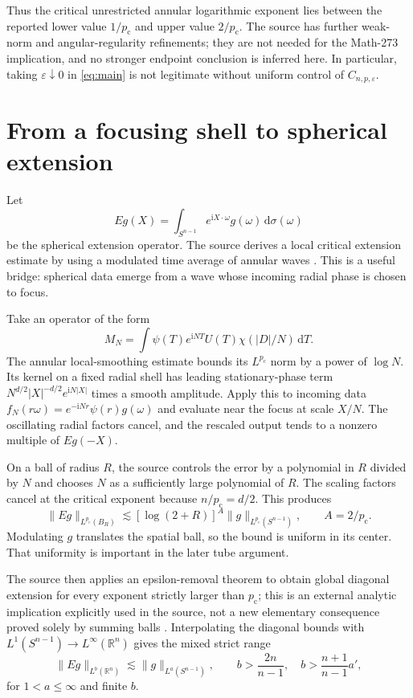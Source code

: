 \documentclass[11pt,a4paper]{article}
\numberwithin{equation}{section}
\theoremstyle{definition}
\theoremstyle{remark}
\newcommand{\R}{\mathbb R}
\newcommand{\eps}{\varepsilon}
\newcommand{\dd}{\,\mathrm d}
\newcommand{\pc}{p_{\mathrm c}}
\begin{document}
Thus the critical unrestricted annular logarithmic exponent lies between the
reported lower value $1/\pc$ and upper value $2/\pc$. The source has further
weak-norm and angular-regularity refinements; they are not needed for the
Math-273 implication, and no stronger endpoint conclusion is inferred here.
In particular, taking $\eps\downarrow0$ in \eqref{eq:main} is not legitimate
without uniform control of $C_{n,p,\eps}$.

\section{From a focusing shell to spherical extension}
\label{sec:restriction}
Let
\[
 Eg(X)=\int_{S^{n-1}}e^{\mathrm iX\cdot\omega}g(\omega)\dd\sigma(\omega)
\]
be the spherical extension operator. The source derives a local critical
extension estimate by using a modulated time average of annular waves
\cite{kakeya-proof}. This is a useful bridge: spherical data emerge from a
wave whose incoming radial phase is chosen to focus.

Take an operator of the form
\[
 M_N=\int\psi(T)e^{\mathrm iNT}U(T)\chi(|D|/N)\dd T.
\]
The annular local-smoothing estimate bounds its $L^{\pc}$ norm by a power of
$\log N$. Its kernel on a fixed radial shell has leading stationary-phase
term $N^{d/2}|X|^{-d/2}e^{\mathrm iN|X|}$ times a smooth amplitude.
Apply this to incoming data
$f_N(r\omega)=e^{-\mathrm iNr}\psi(r)g(\omega)$ and evaluate near the focus
at scale $X/N$. The oscillating radial factors cancel, and the rescaled
output tends to a nonzero multiple of $Eg(-X)$.

On a ball of radius $R$, the source controls the error by a polynomial in
$R$ divided by $N$ and chooses $N$ as a sufficiently large polynomial of $R$.
The scaling factors cancel at the critical exponent because
$n/\pc=d/2$. This produces
\begin{equation}\label{eq:localextension}
 \|Eg\|_{L^{\pc}(B_R)}\lesssim
 [\log(2+R)]^{A}\|g\|_{L^{\pc}(S^{n-1})},\qquad A=2/\pc.
\end{equation}
Modulating $g$ translates the spatial ball, so the bound is uniform in its
center. That uniformity is important in the later tube argument.

The source then applies an epsilon-removal theorem to obtain global diagonal
extension for every exponent strictly larger than $\pc$; this is an external
analytic implication explicitly used in the source, not a new elementary
consequence proved solely by summing balls \cite{global-extension}.
Interpolating the diagonal bounds with $L^1(S^{n-1})\to L^\infty(\R^n)$
gives the mixed strict range
\begin{equation}\label{eq:restrictionrange}
 \|Eg\|_{L^b(\R^n)}\lesssim\|g\|_{L^a(S^{n-1})},\qquad
 b>\frac{2n}{n-1},\quad
 b>\frac{n+1}{n-1}a',
\end{equation}
for $1<a\le\infty$ and finite $b$.
\end{document}

